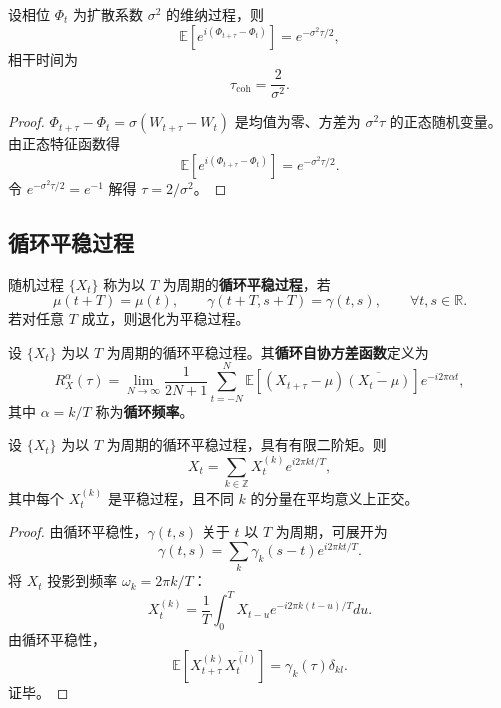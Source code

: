 \begin{lemma}[相位扩散的相干时间]\label{ch15_coherence_time}
设相位 $\Phi_t$ 为扩散系数 $\sigma^2$ 的维纳过程，则
\[
\mathbb E[e^{i(\Phi_{t+\tau}-\Phi_t)}]=e^{-\sigma^2\tau/2},
\]
相干时间为
\[
\tau_{\mathrm{coh}}=\frac{2}{\sigma^2}.
\]
\end{lemma}

\begin{proof}
$\Phi_{t+\tau}-\Phi_t=\sigma(W_{t+\tau}-W_t)$ 是均值为零、方差为 $\sigma^2\tau$ 的正态随机变量。由正态特征函数得
\[
\mathbb E[e^{i(\Phi_{t+\tau}-\Phi_t)}]=e^{-\sigma^2\tau/2}.
\]
令 $e^{-\sigma^2\tau/2}=e^{-1}$ 解得 $\tau=2/\sigma^2$。
\end{proof}

\subsection{循环平稳过程}

\begin{definition}[循环平稳过程]\label{def:cyclostationary_strict}
随机过程 $\{X_t\}$ 称为以 $T$ 为周期的\textbf{循环平稳过程}，若
\[
\mu(t+T)=\mu(t),\qquad \gamma(t+T,s+T)=\gamma(t,s),\qquad \forall t,s\in\mathbb R.
\]
若对任意 $T$ 成立，则退化为平稳过程。
\end{definition}

\begin{definition}[循环自协方差函数]\label{def:cyclic_autocovariance}
设 $\{X_t\}$ 为以 $T$ 为周期的循环平稳过程。其\textbf{循环自协方差函数}定义为
\[
R_X^\alpha(\tau)=\lim_{N\to\infty}\frac1{2N+1}\sum_{t=-N}^{N}\mathbb E[(X_{t+\tau}-\mu)\overline{(X_t-\mu)}]e^{-i2\pi\alpha t},
\]
其中 $\alpha=k/T$ 称为\textbf{循环频率}。
\end{definition}

\begin{theorem}[循环平稳过程的谱分解]\label{thm:cyclostationary_spectral_decomposition}
设 $\{X_t\}$ 为以 $T$ 为周期的循环平稳过程，具有有限二阶矩。则
\[
X_t=\sum_{k\in\mathbb Z}X_t^{(k)}e^{i2\pi kt/T},
\]
其中每个 $X_t^{(k)}$ 是平稳过程，且不同 $k$ 的分量在平均意义上正交。
\end{theorem}

\begin{proof}
由循环平稳性，$\gamma(t,s)$ 关于 $t$ 以 $T$ 为周期，可展开为
\[
\gamma(t,s)=\sum_k\gamma_k(s-t)e^{i2\pi kt/T}.
\]
将 $X_t$ 投影到频率 $\omega_k=2\pi k/T$：
\[
X_t^{(k)}=\frac1T\int_0^TX_{t-u}e^{-i2\pi k(t-u)/T}du.
\]
由循环平稳性，
\[
\mathbb E[X_{t+\tau}^{(k)}\overline{X_t^{(l)}}]=\gamma_k(\tau)\delta_{kl}.
\]
证毕。
\end{proof}

